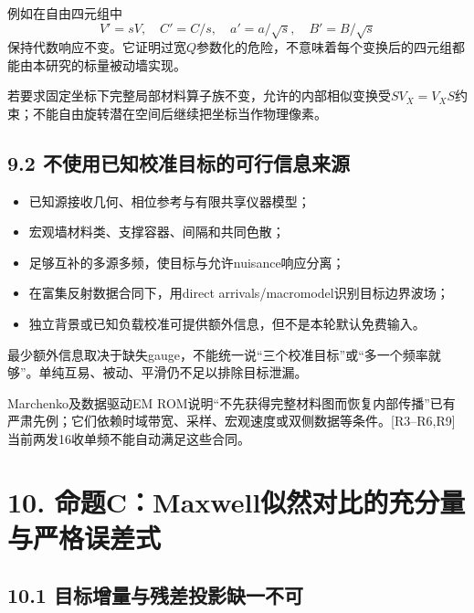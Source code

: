 \documentclass[
  10pt,
  a4paper,
]{article}
\providecommand{\tightlist}{%
  \setlength{\itemsep}{0pt}\setlength{\parskip}{0pt}}
\providecommand{\tightlist}{\setlength{\itemsep}{1pt}\setlength{\parskip}{1pt}}
\begin{document}
例如在自由四元组中 \[
V'=sV,\quad C'=C/s,\quad
a'=a/\sqrt{s},\quad B'=B/\sqrt{s}
\]
保持代数响应不变。它证明过宽\(Q\)参数化的危险，不意味着每个变换后的四元组都能由本研究的标量被动墙实现。

若要求固定坐标下完整局部材料算子族不变，允许的内部相似变换受\(SV_X=V_XS\)约束；不能自由旋转潜在空间后继续把坐标当作物理像素。

\hypertarget{ux4e0dux4f7fux7528ux5df2ux77e5ux6821ux51c6ux76eeux6807ux7684ux53efux884cux4fe1ux606fux6765ux6e90}{%
\subsection{9.2
不使用已知校准目标的可行信息来源}\label{ux4e0dux4f7fux7528ux5df2ux77e5ux6821ux51c6ux76eeux6807ux7684ux53efux884cux4fe1ux606fux6765ux6e90}}

\begin{itemize}
\tightlist
\item
  已知源接收几何、相位参考与有限共享仪器模型；
\item
  宏观墙材料类、支撑容器、间隔和共同色散；
\item
  足够互补的多源多频，使目标与允许nuisance响应分离；
\item
  在富集反射数据合同下，用direct arrivals/macromodel识别目标边界波场；
\item
  独立背景或已知负载校准可提供额外信息，但不是本轮默认免费输入。
\end{itemize}

最少额外信息取决于缺失gauge，不能统一说``三个校准目标''或``多一个频率就够''。单纯互易、被动、平滑仍不足以排除目标泄漏。

Marchenko及数据驱动EM
ROM说明``不先获得完整材料图而恢复内部传播''已有严肃先例；它们依赖时域带宽、采样、宏观速度或双侧数据等条件。{[}R3--R6,R9{]}
当前两发16收单频不能自动满足这些合同。

\hypertarget{ux547dux9898cmaxwellux4f3cux7136ux5bf9ux6bd4ux7684ux5145ux5206ux91cfux4e0eux4e25ux683cux8befux5deeux5f0f}{%
\section{10.
命题C：Maxwell似然对比的充分量与严格误差式}\label{ux547dux9898cmaxwellux4f3cux7136ux5bf9ux6bd4ux7684ux5145ux5206ux91cfux4e0eux4e25ux683cux8befux5deeux5f0f}}

\hypertarget{ux76eeux6807ux589eux91cfux4e0eux6b8bux5deeux6295ux5f71ux7f3aux4e00ux4e0dux53ef}{%
\subsection{10.1
目标增量与残差投影缺一不可}\label{ux76eeux6807ux589eux91cfux4e0eux6b8bux5deeux6295ux5f71ux7f3aux4e00ux4e0dux53ef}}
\end{document}
